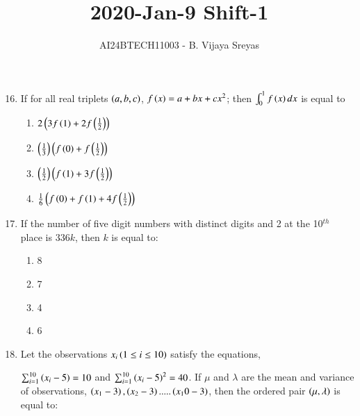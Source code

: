 \documentclass[journal,12pt,twocolumn]{IEEEtran}
\theoremstyle{remark}
\begin{document}

\vspace{3cm}

\title{2020-Jan-9 Shift-1}
\author{AI24BTECH11003 - B. Vijaya Sreyas}
\maketitle
\newpage
\bigskip

\renewcommand{\thefigure}{\theenumi}
\renewcommand{\thetable}{\theenumi}
\begin{enumerate}
\setcounter{enumi}{15}
 
    \item If for all real triplets $\left(a, b, c\right)$, $f\left(x\right)=a+bx+cx^2$; then $\int_0^1f\left(x\right)dx$ is equal to

        \begin{multicols}{1}
            \begin{enumerate}
                \item $2\left(3f\left(1\right)+ 2f\left(\frac{1}{2}\right)\right)$
                \item $\left(\frac{1}{3}\right)\left(f\left(0\right)+f\left(\frac{1}{2}\right)\right)$
                \item $\left(\frac{1}{2}\right)\left(f\left(1\right)+3f\left(\frac{1}{2}\right)\right)$
                \item ${\frac{1}{6}}\left(f\left(0\right)+f\left(1\right)+4f\left(\frac{1}{2}\right)\right)$
            \end{enumerate}
        \end{multicols}

    \item If the number of five digit numbers with distinct digits and 2 at the 10$^{th}$ place is $336k$, then $k$ is equal to:

		\begin{multicols}{4}
			\begin{enumerate}
				\item 8
				\item 7
				\item 4
				\item 6
			\end{enumerate}
		\end{multicols}

    \item Let the observations $x_i\left(1\leq i \leq 10\right)$ satisfy the equations,

    $\sum_{i=1}^{10} \left(x_i - 5\right)=10$
    and
    $\sum_{i=1}^{10} \left(x_i-5\right)^2=40$.
    If $\mu$ and $\lambda$ are the mean and variance of observations, $\left(x_1-3\right), \left(x_2-3\right).....\left(x_10-3\right)$, then the ordered pair $\left(\mu, \lambda\right)$ is equal to:


\end{enumerate}
\end{document}
